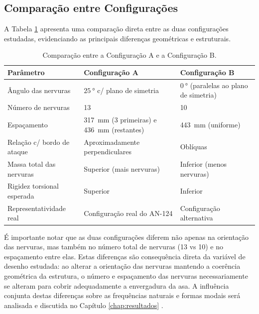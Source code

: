\documentclass[a4paper,fleqn,noprintline]{cas-dc}
\begin{document}
\subsection{Comparação entre Configurações}

A Tabela \ref{tab:comparacao_configs} apresenta uma comparação direta entre as duas configurações estudadas, evidenciando as principais diferenças geométricas e estruturais.

\begin{table}[h!]
\centering
\caption{Comparação entre a Configuração A e a Configuração B.}
\label{tab:comparacao_configs}
\renewcommand{\arraystretch}{1.4}
\begin{tabularx}{\textwidth}{p{4.5cm} X X}
\toprule
\textbf{Parâmetro} & \textbf{Configuração A} & 
\textbf{Configuração B} \\
\midrule
Ângulo das nervuras         
    & $\qty{25}{\degree}$ c/ plano de simetria    
    & $\qty{0}{\degree}$ (paralelas ao plano de simetria) \\
Número de nervuras          
    & 13                            
    & 10 \\
Espaçamento                 
    & \SI{317}{\milli\meter} (3 primeiras) e \SI{436}{\milli\meter} (restantes)
    & \SI{443}{\milli\meter} (uniforme) \\
Relação c/ bordo de ataque  
    & Aproximadamente perpendiculares   
    & Oblíquas \\
Massa total das nervuras    
    & Superior (mais nervuras)      
    & Inferior (menos nervuras) \\
Rigidez torsional esperada  
    & Superior                      
    & Inferior \\
Representatividade real     
    & Configuração real do AN-124   
    & Configuração alternativa \\
\bottomrule
\end{tabularx}
\end{table}

É importante notar que as duas configurações diferem não apenas na orientação das nervuras, mas também no número total de nervuras (13 vs 10) e no espaçamento entre elas. Estas diferenças são consequência direta da variável de desenho estudada: ao alterar a orientação das nervuras mantendo a coerência geométrica da estrutura, o número e espaçamento das nervuras necessariamente se alteram para cobrir adequadamente a envergadura da asa. A influência conjunta destas diferenças sobre as frequências naturais e formas modais será analisada e discutida no Capítulo \ref{chap:resultados} \cite{Wright2015, Dowell2004}.
\end{document}
